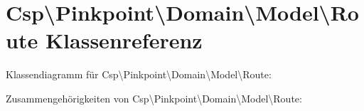 \hypertarget{classCsp_1_1Pinkpoint_1_1Domain_1_1Model_1_1Route}{}\section{Csp\textbackslash{}Pinkpoint\textbackslash{}Domain\textbackslash{}Model\textbackslash{}Route Klassenreferenz}
\label{classCsp_1_1Pinkpoint_1_1Domain_1_1Model_1_1Route}


Klassendiagramm für Csp\textbackslash{}Pinkpoint\textbackslash{}Domain\textbackslash{}Model\textbackslash{}Route\+:


Zusammengehörigkeiten von Csp\textbackslash{}Pinkpoint\textbackslash{}Domain\textbackslash{}Model\textbackslash{}Route\+:
